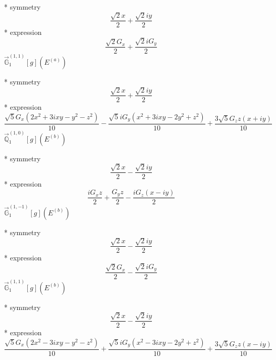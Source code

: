 \documentclass[fleqn,8pt]{jsarticle}
\begin{document}
\noindent\quad ** symmetry
\begin{dmath*}
\frac{\sqrt{2} x}{2} + \frac{\sqrt{2} i y}{2}
\end{dmath*}
\noindent\quad ** expression
\begin{dmath*}
\frac{\sqrt{2} G_{x}}{2} + \frac{\sqrt{2} i G_{y}}{2}
\end{dmath*}
\noindent\quad $\vec{\mathbb{G}}_{1}^{(1,1)}[g](E^{(a)})$

\noindent\quad ** symmetry
\begin{dmath*}
\frac{\sqrt{2} x}{2} + \frac{\sqrt{2} i y}{2}
\end{dmath*}
\noindent\quad ** expression
\begin{dmath*}
\frac{\sqrt{5} G_{x} \left(2 x^{2} + 3 i x y - y^{2} - z^{2}\right)}{10} - \frac{\sqrt{5} i G_{y} \left(x^{2} + 3 i x y - 2 y^{2} + z^{2}\right)}{10} + \frac{3 \sqrt{5} G_{z} z \left(x + i y\right)}{10}
\end{dmath*}
\noindent\quad $\vec{\mathbb{Q}}_{1}^{(1,0)}[g](E^{(b)})$

\noindent\quad ** symmetry
\begin{dmath*}
\frac{\sqrt{2} x}{2} - \frac{\sqrt{2} i y}{2}
\end{dmath*}
\noindent\quad ** expression
\begin{dmath*}
\frac{i G_{x} z}{2} + \frac{G_{y} z}{2} - \frac{i G_{z} \left(x - i y\right)}{2}
\end{dmath*}
\noindent\quad $\vec{\mathbb{G}}_{1}^{(1,-1)}[g](E^{(b)})$

\noindent\quad ** symmetry
\begin{dmath*}
\frac{\sqrt{2} x}{2} - \frac{\sqrt{2} i y}{2}
\end{dmath*}
\noindent\quad ** expression
\begin{dmath*}
\frac{\sqrt{2} G_{x}}{2} - \frac{\sqrt{2} i G_{y}}{2}
\end{dmath*}
\noindent\quad $\vec{\mathbb{G}}_{1}^{(1,1)}[g](E^{(b)})$

\noindent\quad ** symmetry
\begin{dmath*}
\frac{\sqrt{2} x}{2} - \frac{\sqrt{2} i y}{2}
\end{dmath*}
\noindent\quad ** expression
\begin{dmath*}
\frac{\sqrt{5} G_{x} \left(2 x^{2} - 3 i x y - y^{2} - z^{2}\right)}{10} + \frac{\sqrt{5} i G_{y} \left(x^{2} - 3 i x y - 2 y^{2} + z^{2}\right)}{10} + \frac{3 \sqrt{5} G_{z} z \left(x - i y\right)}{10}
\end{dmath*}
\end{document}
